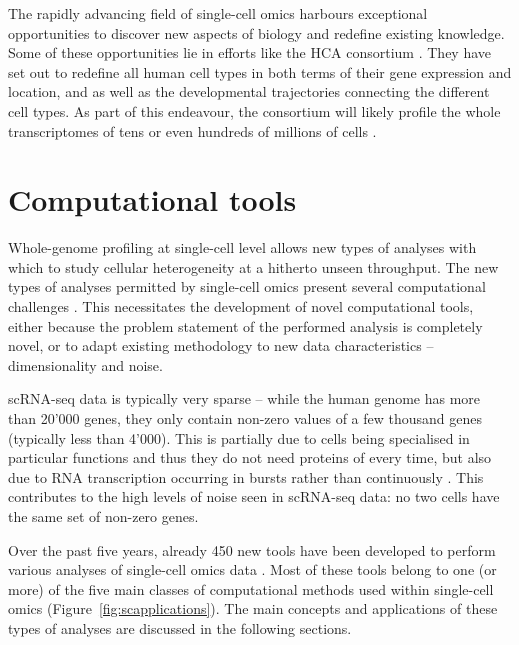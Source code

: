 The rapidly advancing field of single-cell omics harbours exceptional opportunities to discover new aspects of biology and redefine existing knowledge. Some of these opportunities lie in efforts like the HCA consortium \cite{regev_humancellatlas_2018}. They have set out to redefine all human cell types in both terms of their gene expression and location, and as well as the developmental trajectories connecting the different cell types. As part of this endeavour, the consortium will likely profile the whole transcriptomes of tens or even hundreds of millions of cells \cite{humancellatlasconsortium_humancellatlas_2018}. 

\section{Computational tools} \label{sec:comptools}
Whole-genome profiling at single-cell level allows new types of analyses with which to study cellular heterogeneity at a hitherto unseen throughput. 
The new types of analyses permitted by single-cell omics present several computational challenges \cite{stegle_computationalanalyticalchallenges_2015, yuan_challengesemergingdirections_2017, chen_singlecellrnaseqtechnologies_2019}. This necessitates the development of novel computational tools, either because the problem statement of the performed analysis is completely novel, or to adapt existing methodology to new data characteristics -- dimensionality and noise. 

scRNA-seq data is typically very sparse -- while the human genome has more than 20'000 genes, they only contain non-zero values of a few thousand genes (typically less than 4'000). This is partially due to cells being specialised in particular functions and thus they do not need proteins of every time, but also due to RNA transcription occurring in bursts rather than continuously \cite{nicolas_whatshapeseukaryotic_2017}. This contributes to the high levels of noise seen in scRNA-seq data: no two cells have the same set of non-zero genes. 

Over the past five years, already 450 new tools have been developed to perform various analyses of single-cell omics data \cite{zappia_exploringsinglecellrnaseq_2018}. Most of these tools belong to one (or more) of the five main classes of computational methods used within single-cell omics (Figure~\ref{fig:scapplications}). The main concepts and applications of these types of analyses are discussed in the following sections.


